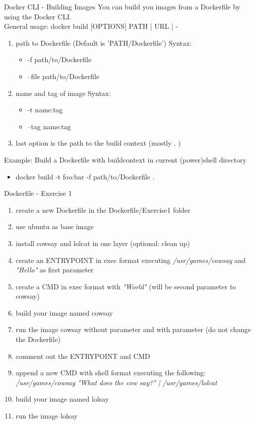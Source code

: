 \documentclass[10pt,aspectratio=\ratio,
compress
]{beamer}
\begin{document}
\begin{frame}{Docker CLI - Building Images}
You can build you images from a Dockerfile by using the Docker CLI. \\
General usage: docker build [OPTIONS] PATH | URL | - \\

\begin{enumerate}
\item path to Dockerfile (Default is 'PATH/Dockerfile')
Syntax:
\begin{itemize}
	\item -f path/to/Dockerfile
	\item --file path/to/Dockerfile
\end{itemize}
\item name and tag of image
Syntax:
\begin{itemize}
	\item -t name:tag
	\item --tag name:tag
\end{itemize}
\item last option is the path to the build context (mostly . )
\end{enumerate}

Example: Build a Dockerfile with buildcontext in current (power)shell directory
\begin{itemize}
	\item docker build -t foo:bar -f path/to/Dockerfile .
\end{itemize}
\end{frame}

\begin{frame}{Dockerfile - Exercise 1}
\begin{enumerate}
	\item create a new Dockerfile in the Dockerfile/Exercise1 folder
	\item use ubuntu as base image
	\item install cowsay and lolcat in one layer (optional: clean up)
	\item create an ENTRYPOINT in exec format executing \emph{/usr/games/cowsay} and \emph{"Hello"} as first parameter
	\item create a CMD in exec format with \emph{"World"} (will be second parameter to cowsay)
	\item build your image named cowsay
	\item run the image cowsay without parameter and with parameter (do not change the Dockerfile)
	\item comment out the ENTRYPOINT and CMD
	\item append a new CMD with shell format executing the following: \\ \emph{/usr/games/cowsay "What does the cow say?" | /usr/games/lolcat}
	\item build your image named lolsay
	\item run the image lolsay
\end{enumerate}
\end{frame}
\end{document}
